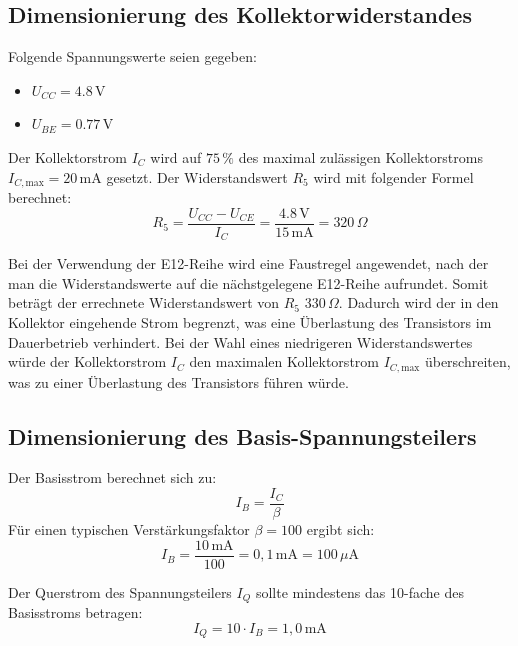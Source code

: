 \subsection{Dimensionierung des Kollektorwiderstandes}
\label{subsec:rechnungkollektor}

Folgende Spannungswerte seien gegeben:
\begin{itemize}
    \item $U_{CC} = 4.8\,\mathrm{V}$
    \item $U_{BE} = 0.77\,\mathrm{V}$
\end{itemize}

Der Kollektorstrom $I_C$ wird auf $75\,\%$ des maximal zulässigen Kollektorstroms \\$I_{C,\mathrm{max}} = 20\,\mathrm{mA}$ gesetzt. 
Der Widerstandswert $R_5$ wird mit folgender Formel berechnet:
\begin{equation}
    R_5 = \frac{U_{CC} - U_{CE}}{I_C} = \frac{4.8\,\mathrm{V}}{15\,\mathrm{mA}} = 320\,\Omega
\end{equation}

Bei der Verwendung der E12-Reihe wird eine Faustregel angewendet, nach der man die Widerstandswerte auf die nächstgelegene E12-Reihe aufrundet. 
Somit beträgt der errechnete Widerstandswert von $R_5$ 330\,\(\Omega\). Dadurch wird der in den Kollektor eingehende Strom begrenzt, was eine Überlastung des Transistors im Dauerbetrieb verhindert. 
Bei der Wahl eines niedrigeren Widerstandswertes würde der Kollektorstrom $I_C$ den maximalen Kollektorstrom $I_{C,\mathrm{max}}$ überschreiten, was zu einer Überlastung des Transistors führen würde.

\subsection{Dimensionierung des Basis-Spannungsteilers}
\label{subsec:basis-spannungsteiler}
Der Basisstrom berechnet sich zu:
\begin{equation}
    I_B = \frac{I_C}{\beta}
\end{equation}
Für einen typischen Verstärkungsfaktor $\beta = 100$ ergibt sich:
\begin{equation}
    I_B = \frac{10\,\mathrm{mA}}{100} = 0{,}1\,\mathrm{mA} = 100\,\mu\mathrm{A}
\end{equation}

Der Querstrom des Spannungsteilers $I_Q$ sollte mindestens das 10-fache des Basisstroms betragen:
\begin{equation}
    I_Q = 10 \cdot I_B = 1{,}0\,\mathrm{mA}
\end{equation}


